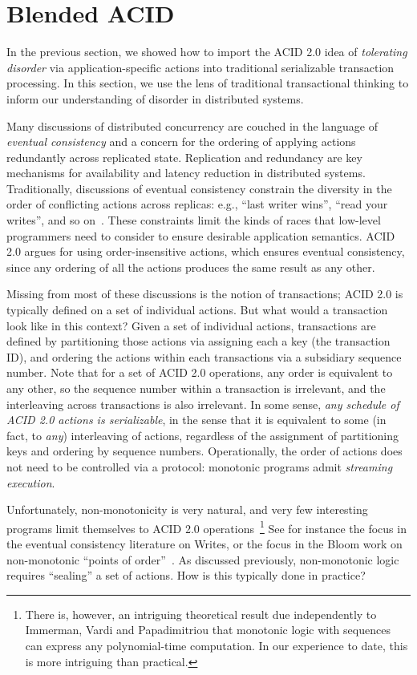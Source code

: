\documentclass{sig-alternate}
\begin{document}
\section{Blended ACID}
In the previous section, we showed how to import the ACID 2.0 idea of
\emph{tolerating disorder} via application-specific actions into traditional
serializable transaction processing. In this section, we use the lens of
traditional transactional thinking to inform our understanding of disorder in
distributed systems.

Many discussions of distributed concurrency are couched in the language of
\emph{eventual consistency} and a concern for the ordering of applying actions
redundantly across replicated state.  Replication and redundancy are key
mechanisms for availability and latency reduction in distributed systems.
Traditionally, discussions of eventual consistency constrain the diversity in
the order of conflicting actions across replicas: e.g., ``last writer wins'',
``read your writes'', and so on~\cite{Terry1994}.  These constraints limit the
kinds of races that low-level programmers need to consider to ensure desirable
application semantics.  ACID 2.0 argues for using order-insensitive actions,
which ensures eventual consistency, since any ordering of all the actions
produces the same result as any other.

Missing from most of these discussions is the notion of transactions; ACID 2.0
is typically defined on a set of individual actions.  But what would a
transaction look like in this context?  Given a set of individual actions,
transactions are defined by partitioning those actions via assigning each a key
(the transaction ID), and ordering the actions within each transactions via a
subsidiary sequence number.  Note that for a set of ACID 2.0 operations, any
order is equivalent to any other, so the sequence number within a transaction is
irrelevant, and the interleaving across transactions is also irrelevant.  In
some sense, \emph{any schedule of ACID 2.0 actions is serializable}, in the
sense that it is equivalent to some (in fact, to \emph{any}) interleaving of
actions, regardless of the assignment of partitioning keys and ordering by
sequence numbers.  Operationally, the order of actions does not need to be
controlled via a protocol: monotonic programs admit \emph{streaming execution}.

Unfortunately, non-monotonicity is very natural, and very few interesting
programs limit themselves to ACID 2.0 operations~\footnote{There is, however, an
  intriguing theoretical result due independently to Immerman, Vardi and
  Papadimitriou that monotonic logic with sequences can express any
  polynomial-time computation.  In our experience to date, this is more
  intriguing than practical.}  See for instance the focus in the eventual
consistency literature on Writes, or the focus in the Bloom work on
non-monotonic ``points of order''~\cite{Alvaro2011}.  As discussed previously,
non-monotonic logic requires ``sealing'' a set of actions.  How is this
typically done in practice?
\end{document}
